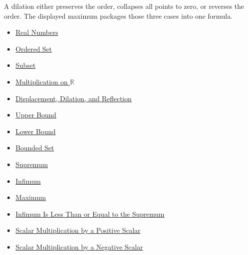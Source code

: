 \begin{remark*}[Interpretation]
A dilation either preserves the order, collapses all points to zero, or reverses the order. The displayed maximum packages those three cases into one formula.
\end{remark*}

\begin{dependencies}
\begin{itemize}
  \item \hyperref[def:reals]{Real Numbers}
  \item \hyperref[def:ordered-set]{Ordered Set}
  \item \hyperref[def:subset]{Subset}
  \item \hyperref[def:multiplication-on-r]{Multiplication on $\mathbb{R}$}
  \item \hyperref[def:displacement-dilation-reflection]{Displacement, Dilation, and Reflection}
  \item \hyperref[def:real-upper-bound]{Upper Bound}
  \item \hyperref[def:real-lower-bound]{Lower Bound}
  \item \hyperref[def:bounded]{Bounded Set}
  \item \hyperref[def:supremum]{Supremum}
  \item \hyperref[def:infimum]{Infimum}
  \item \hyperref[def:maximum]{Maximum}
  \item \hyperref[thm:infimum-less-than-supremum]{Infimum Is Less Than or Equal to the Supremum}
  \item \hyperref[thm:scalar-mult-positive]{Scalar Multiplication by a Positive Scalar}
  \item \hyperref[thm:scalar-mult-negative]{Scalar Multiplication by a Negative Scalar}
\end{itemize}
\end{dependencies}


